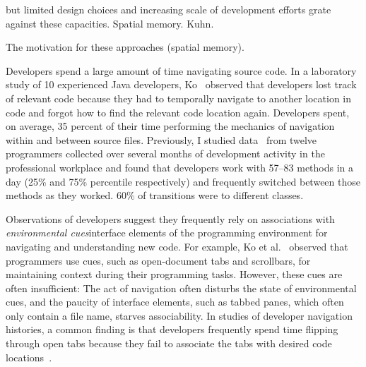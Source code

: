 \documentclass[conference]{IEEEtran}
\begin{document}
but limited design choices and increasing 
scale of development efforts grate against these capacities.  
Spatial memory.  Kuhn.




The motivation for these approaches (spatial memory).

Developers spend a large amount of time navigating source code.
In a laboratory study of 10 experienced Java developers, Ko~\cite{KoMaintenance06} observed that developers lost track of relevant code because they had to temporally navigate to another location in code and forgot how to find the relevant code location again. Developers spent, on average, 35 percent of their time performing the mechanics of navigation within and between source files. Previously, I studied data~\cite{Parnin:2006b} from twelve programmers collected over several months of development activity in the professional workplace and found that developers work with 57--83 methods in a day (25\% and 75\% percentile respectively) and frequently switched between those methods as they worked. 60\% of transitions were to different classes.

Observations of developers suggest they frequently rely on associations with \emph{environmental cues}\textemdash interface elements of the programming environment\textemdash 
for navigating and understanding new code.  For example, Ko et al.~\cite{KoMaintenance06} observed that programmers use cues, such as open-document tabs and scrollbars, 
for maintaining context during their programming tasks.  However, these cues are often insufficient: The act of navigation often disturbs the state of environmental cues, 
and the paucity of interface elements, such as tabbed panes, which often only contain a file name, starves associability.
In studies of developer navigation histories, a common finding is that developers frequently spend time flipping through open tabs because they fail to associate the tabs with desired code locations~\cite{Singer05}.

\end{document}
